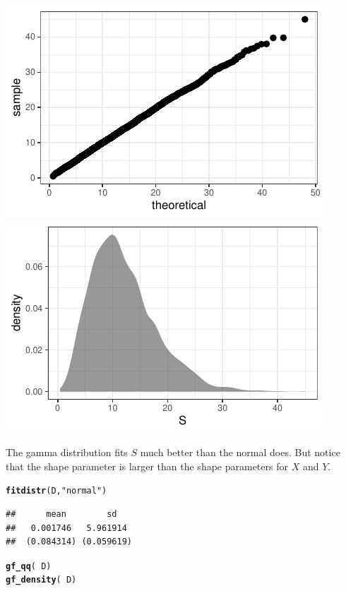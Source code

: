 \documentclass[twoside]{book}\usepackage[]{graphicx}\usepackage[]{xcolor}
\makeatletter
\def\maxwidth{ %
  \ifdim\Gin@nat@width>\linewidth
    \linewidth
  \else
    \Gin@nat@width
  \fi
}
\newcommand{\hlstr}[1]{\textcolor[rgb]{0.192,0.494,0.8}{#1}}%
\newcommand{\hlopt}[1]{\textcolor[rgb]{0,0,0}{#1}}%
\newcommand{\hlstd}[1]{\textcolor[rgb]{0.345,0.345,0.345}{#1}}%
\newcommand{\hlkwd}[1]{\textcolor[rgb]{0.737,0.353,0.396}{\textbf{#1}}}%
\newenvironment{kframe}{%
 \def\at@end@of@kframe{}%
 \ifinner\ifhmode%
  \def\at@end@of@kframe{\end{minipage}}%
  \begin{minipage}{\columnwidth}%
 \fi\fi%
 \def\FrameCommand##1{\hskip\@totalleftmargin \hskip-\fboxsep
 \colorbox{shadecolor}{##1}\hskip-\fboxsep
     \hskip-\linewidth \hskip-\@totalleftmargin \hskip\columnwidth}%
 \MakeFramed {\advance\hsize-\width
   \@totalleftmargin\z@ \linewidth\hsize
   \@setminipage}}%
 {\par\unskip\endMakeFramed%
 \at@end@of@kframe}
\newenvironment{knitrout}{}{} %
\makeatother
\begin{document}
\begin{solution}
\begin{knitrout}
{\centering \includegraphics[width=\maxwidth]{figures/fig-unnamed-chunk-146-1} 
\includegraphics[width=\maxwidth]{figures/fig-unnamed-chunk-146-2} 

}



\end{knitrout}
The gamma distribution fits $S$ much better than the normal does.  But notice that the 
shape parameter is larger than the shape parameters for $X$ and $Y$.

\begin{knitrout}
\color{fgcolor}\begin{kframe}
\begin{alltt}
\hlkwd{fitdistr}\hlstd{(D,} \hlstr{"normal"}\hlstd{)}
\end{alltt}
\begin{verbatim}
##      mean        sd   
##   0.001746   5.961914 
##  (0.084314) (0.059619)
\end{verbatim}
\begin{alltt}
\hlkwd{gf_qq}\hlstd{(} \hlopt{~} \hlstd{D)}
\hlkwd{gf_density}\hlstd{(} \hlopt{~} \hlstd{D)}
\end{alltt}
\end{kframe}


\end{knitrout}
\end{solution}
\end{document}

